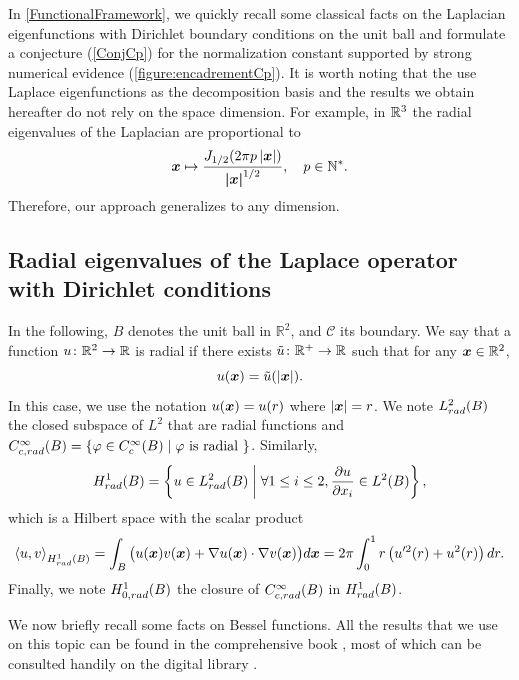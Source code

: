 \documentclass[smallextended]{svjour3}
\begin{document}
In \autoref{FunctionalFramework}, we quickly recall some classical facts on the Laplacian eigenfunctions with Dirichlet boundary conditions on the unit ball and formulate a conjecture (\autoref{ConjCp}) for the normalization constant supported by strong numerical evidence (\autoref{figure:encadrementCp}). It is worth noting that the use Laplace eigenfunctions as the decomposition basis and the results we obtain hereafter do not rely on the space dimension. For example, in $\mathbb{R}^3$ the radial eigenvalues of the Laplacian are proportional to
\[  \boldsymbol{x} \mapsto \dfrac{J_{1/2}(2\pi p\left\lvert \boldsymbol{x} \right\rvert)}{\boldsymbol{|x|}^{1/2}}, \quad  p\in\mathbb{N}^*.\] 
Therefore, our approach generalizes \cite{Alouges2015} to any dimension.  
\subsection{Radial eigenvalues of the Laplace operator with Dirichlet conditions}
\label{FunctionalFramework}
In the following, $B$ denotes the unit ball in $\mathbb{R}^2$, and $\mathcal{C}$ its boundary. We say that a function $u\colon\mathbb{R}^2\rightarrow \mathbb{R}$ is radial if there exists $\tilde{u}\colon\mathbb{R}^+\to \mathbb{R}$ such that for any $\boldsymbol{x} \in \mathbb{R}^2$, 
\[ u(\boldsymbol{x}) = \tilde{u}(\left\lvert \boldsymbol{x} \right\rvert).\] 
In this case, we use the notation $u(\boldsymbol{x})= u(r)$ where $\left\lvert \boldsymbol{x} \right\rvert = r$. 
We note $L^2_{rad}(B)$ the closed subspace of $L^2$ that are radial functions and $C^\infty_{c,rad}(B) = \left\{\varphi \in C^{\infty}_c(B)\mathrel{}\middle|\mathrel{}\varphi \text{ is radial }\right\}$. Similarly,
\[H^1_{rad}(B) = \left\{ u \in L^2_{rad}(B)\mathrel{}\middle|\mathrel{} \forall 1 \leq i \leq 2, \dfrac{\partial u}{\partial x_i} \in L^2(B)\right\},\]
which is a Hilbert space with the scalar product
\[\left\langle u,v\right\rangle_{H^1_{rad}(B)} = \int_{B} \big( u(\boldsymbol{x})v(\boldsymbol{x}) + \nabla u(\boldsymbol{x}) \cdot \nabla v(\boldsymbol{x}) \big) d\boldsymbol{x} = 2\pi \int_{0}^1 r\left(u'^2(r) + u^2(r)\right)dr.\]
Finally, we note $H^1_{0,rad}(B)$ the closure of $C^\infty_{c,rad}(B)$ in $H^1_{rad}(B)$. 

We now briefly recall some facts on Bessel functions. All the results that we use on this topic can be found in the comprehensive book \cite{abramowitz1964handbook}, most of which can be consulted handily on the digital library \cite{NIST:DLMF}.
\end{document}
